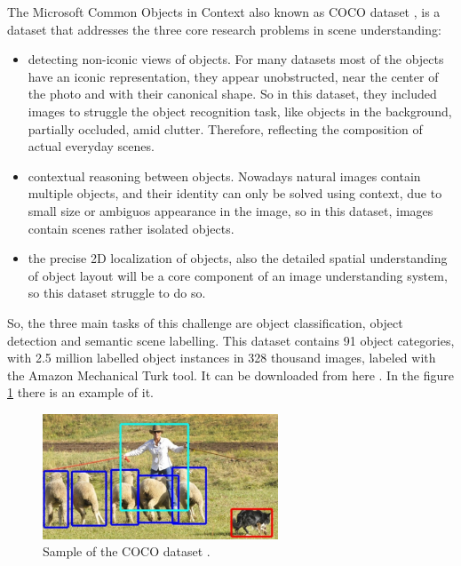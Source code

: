 The Microsoft Common Objects in Context also known as COCO dataset \cite{coco}, is a dataset that addresses the three core research problems in scene understanding:


\begin{itemize}

\item detecting non-iconic views of objects. For many datasets most of the objects have an iconic representation, they appear unobstructed, near the center of the photo and with their canonical shape. So in this dataset, they included images to struggle the object recognition task, like objects in the background, partially occluded, amid clutter. Therefore, reflecting the composition of actual everyday scenes.

\item contextual reasoning between objects. Nowadays natural images contain multiple objects, and their identity can only be solved using context, due to small size or ambiguos appearance in the image, so in this dataset, images contain scenes rather isolated objects. 

\item the precise 2D localization of objects, also the detailed spatial understanding of object layout will be a core component of an image understanding system, so this dataset struggle to do so.



\end{itemize}


So, the three main tasks of this challenge are object classification, object detection and semantic scene labelling. This dataset contains 91 object categories, with 2.5 million labelled object instances in 328 thousand images, labeled with the Amazon Mechanical Turk tool. It can be downloaded from here \cite{cocoWebsite}. In the figure \ref{cocoss} there is an example of it.


\begin{figure}[hptb]
\centering         
\includegraphics[width=7cm]{datasetExample/coco1.png}
\caption{Sample of the COCO dataset .} \label{cocoss}
\end{figure}



